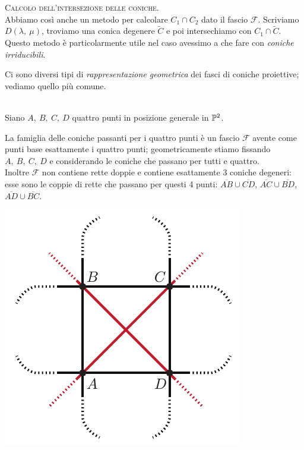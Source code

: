 \begin{tips} \textsc{Calcolo dell'intersezione delle coniche}.\\
	Abbiamo così anche un metodo per calcolare $C_1\cap C_2$ dato il fascio $\mathcal{F}$. Scriviamo $D(\lambda,\ \mu)$, troviamo una conica degenere $\widetilde{C}$ e poi intersechiamo con $C_1\cap\widetilde{C}$. Questo metodo è particolarmente utile nel caso avessimo a che fare con \textit{coniche irriducibili}.
\end{tips}
Ci sono diversi tipi di \textit{rappresentazione geometrica} dei fasci di coniche proiettive; vediamo quello più comune.
\begin{proposition}~{}\\
	Siano $A,\ B,\ C,\ D$ quattro punti in posizione generale in $\proj[2]{\ }$.\\
	\begin{minipage}{0.75\textwidth}
	La famiglia delle coniche passanti per i quattro punti è un fascio $\mathcal{F}$ avente come punti base esattamente i quattro punti; geometricamente stiamo fissando $A,\ B,\ C,\ D$ e considerando le coniche che passano per tutti e quattro.\\
	Inoltre $\mathcal{F}$ non contiene rette doppie e contiene esattamente 3 coniche degeneri: esse sono le coppie di rette che
	passano per questi 4 punti: $\overline{AB}\cup\overline{CD}$, $\overline{AC}\cup \overline{BD}$, $\overline{AD}\cup\overline{BC}$.
	\end{minipage}
	\hspace{1mm}
	\begin{minipage}{0.24\textwidth}
		\includegraphics[trim=0cm 0cm 0cm 0cm,clip,scale=0.50]{images/conicfamily.pdf}
	\end{minipage}

	
\end{proposition}
